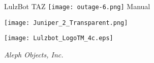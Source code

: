 %
%
%
%
%

\date {}
\thispagestyle{empty}
\begingroup
\centering 

\begin{center}
\fontsize{24pt}{1em}\selectfont LulzBot TAZ
\texttt{[image: outage-6.png]}
\fontsize{24pt}{1em}\selectfont Manual
\end{center}

\par


\texttt{[image: Juniper\_2\_Transparent.png]}

\begin{center}
\texttt{[image: Lulzbot\_LogoTM\_4c.eps]}

{\large \itshape Aleph Objects, Inc.}
\end{center}
\endgroup
